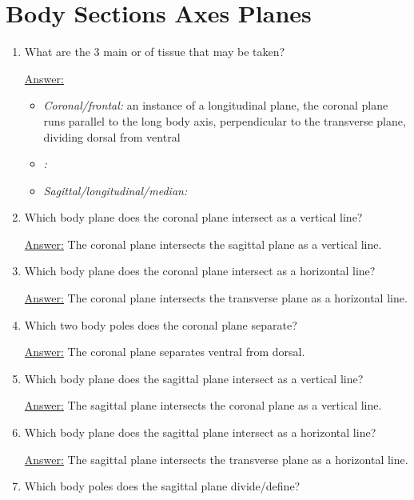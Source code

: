 \documentclass{article}
\newenvironment{QandA}{\begin{enumerate}[label=\bfseries Q\arabic*.]}
                       {\end{enumerate}}
\newenvironment{answered}{\par\normalfont\underline{Answer:}}{}
\begin{document}
\section{Body Sections Axes Planes}
\begin{QandA}
  \item{What are the 3 main  or  of tissue that may be taken?}
    \begin{answered}
    \begin{itemize}
      \item{\textit{Coronal/frontal:} an instance of a longitudinal plane, the coronal plane runs parallel to the long body axis, perpendicular to the transverse plane, dividing dorsal from ventral}
      \item{\textit{: }}
      \item{\textit{Sagittal/longitudinal/median: }}
    \end{itemize}
    \end{answered}
  \item{Which body plane does the coronal plane intersect as a vertical line?}
    \begin{answered}
    The coronal plane intersects the sagittal plane as a vertical line.
    \end{answered}
  \item{Which body plane does the coronal plane intersect as a horizontal line?}
    \begin{answered}
    The coronal plane intersects the transverse plane as a horizontal line.
    \end{answered}
  \item{Which two body poles does the coronal plane separate?}
    \begin{answered}
    The coronal plane separates ventral from dorsal.
    \end{answered}
  \item{Which body plane does the sagittal plane intersect as a vertical line?}
    \begin{answered}
    The sagittal plane intersects the coronal plane as a vertical line.
    \end{answered}
  \item{Which body plane does the sagittal plane intersect as a horizontal line?}
    \begin{answered}
    The sagittal plane intersects the transverse plane as a horizontal line.
    \end{answered}
  \item{Which body poles does the sagittal plane divide/define?}

\end{QandA}
\end{document}
